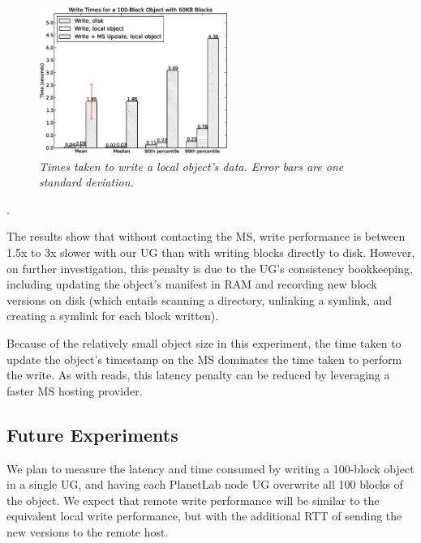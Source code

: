 \begin{figure}[h!]
\centerline{\includegraphics[width=0.55\textwidth]{figures/write_performance}}
\label{fig:write_performance}
\caption{\it Times taken to write a local object's data.  Error bars are one standard deviation.}
\end{figure}.

The results show that without contacting the MS, write performance is between 1.5x to 3x slower with our UG than with writing blocks directly to disk.  However, on further investigation, this penalty is due to the UG's consistency bookkeeping, including updating the object's manifest in RAM and recording new block versions on disk (which entails scanning a directory, unlinking a symlink, and creating a symlink for each block written).

Because of the relatively small object size in this experiment, the time taken to update the object's timestamp on the MS dominates the time taken to perform the write.  As with reads, this latency penalty can be reduced by leveraging a faster MS hosting provider.

\subsection{Future Experiments}

We plan to measure the latency and time consumed by writing a 100-block object in a single UG, and having each PlanetLab node UG overwrite all 100 blocks of the object.  We expect that remote write performance will be similar to the equivalent local write performance, but with the additional RTT of sending the new versions to the remote host.


